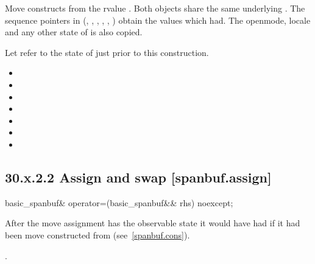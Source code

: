 \documentclass[ebook,11pt,article]{memoir}
\begin{document}
\begin{itemdescr}
\pnum
\effects 
Move constructs from the rvalue . 
Both  objects share the same underlying .
The sequence pointers in 
(, , ,
, , ) obtain
the values which  had. 
The openmode, locale and any other state of  is
also copied.

\pnum
\postconditions Let  refer to the state of
 just prior to this construction.

\begin{itemize}
\item {}
\item {}
\item {}
\item {}
\item {}
\item {}
\item {}
\end{itemize}
\end{itemdescr}


\subsection{30.x.2.2 Assign and swap [spanbuf.assign]}

\begin{itemdecl}
basic_spanbuf& operator=(basic_spanbuf&& rhs) noexcept;
\end{itemdecl}

\begin{itemdescr}
\pnum
\effects After the 
move assignment  has the observable state it would
have had if it had been 
move constructed from  (see~\ref{spanbuf.cons}).

\pnum
\returns {}.
\end{itemdescr}
\end{document}
